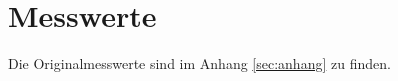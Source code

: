 \section{Messwerte}
\label{sec:messwerte}
Die Originalmesswerte sind im Anhang \autoref{sec:anhang} zu finden.

  